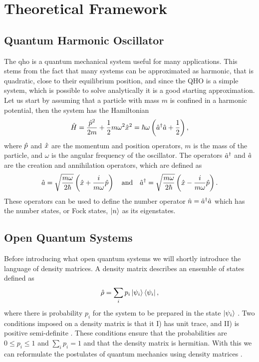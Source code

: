 \section{Theoretical Framework}
\subsection{Quantum Harmonic Oscillator}
The \gls{qho} is a quantum mechanical system useful for many applications. This stems from the fact that many systems can be approximated as harmonic, that is quadratic, close to their equilibrium position, and since the QHO is a simple system, which is possible to solve analytically it is a good starting approximation. Let us start by assuming that a particle with mass $m$ is confined in a harmonic potential, then the system has the Hamiltonian
\begin{equation}
    \hat{H} = \frac{\hat{p}^2}{2m} + \frac{1}{2}m\omega^2\hat{x}^2 = \hbar\omega\left(\hat{a}^{\dagger}\hat{a} + \frac{1}{2}\right), \label{eq:hamiltonian}
\end{equation}
where $\hat{p}$ and $\hat{x}$ are the momentum and position operators, $m$ is the mass of the particle, and $\omega$ is the angular frequency of the oscillator. The operators $\hat{a}^{\dagger}$ and $\hat{a}$ are the creation and annihilation operators, which are defined as
\begin{equation}
    \hat{a} = \sqrt{\frac{m\omega}{2\hbar}} \left(\hat{x} + \frac{i}{m\omega} \hat{p}\right) \quad \text{and} \quad \hat{a}^{\dagger} = \sqrt{\frac{m\omega}{2\hbar}} \left(\hat{x} - \frac{i}{m\omega} \hat{p}\right).
\end{equation}
These operators can be used to define the number operator $\hat{n} = \hat{a}^{\dagger}\hat{a}$ which has the number states, or Fock states, $\ket{n}$ as its eigenstates. 

\subsection{Open Quantum Systems}
Before introducing what open quantum systems we will shortly introduce the language of density matrices. A density matrix describes an ensemble of states defined as 
\begin{equation}
    \hat{\rho} = \sum_i p_i \ket{\psi_i} \bra{\psi_i},
\end{equation}
where there is probability $p_i$ for the system to be prepared in the state $\ket{\psi_i}$ \cite{Nielsen:2010}. Two conditions imposed on a density matrix is that it I) has unit trace, and II) is positive semi-definite \cite{Nielsen:2010}. These conditions ensure that the probabilities are $0 \leq p_i \leq 1$ and $\sum_i p_i = 1$ and that the density matrix is hermitian. With this we can reformulate the postulates of quantum mechanics using density matrices \cite{Nielsen:2010}.


